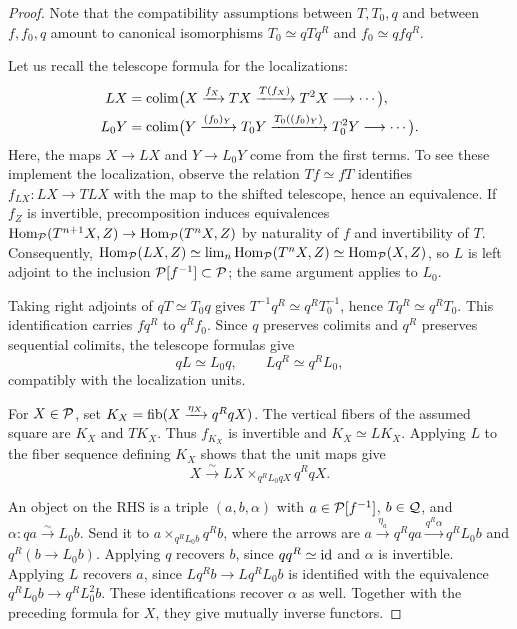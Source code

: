 \documentclass[12pt, letter]{amsart}
\theoremstyle{definition}
\begin{document}
\begin{proof}
Note that the compatibility assumptions between $T, T_0, q$ and between $f, f_0, q$ amount to canonical isomorphisms $T_0 \simeq q T q^R$ and $f_0 \simeq q f q^R$. 

Let us recall the telescope formula for the localizations:
\[
\begin{aligned}
 LX&=\operatorname*{colim}\bigl(X\xrightarrow{f_X}TX
       \xrightarrow{T(f_X)}T^2X\longrightarrow\cdots\bigr),\\
 L_0Y&=\operatorname*{colim}\bigl(Y\xrightarrow{(f_0)_Y}T_0Y
       \xrightarrow{T_0((f_0)_Y)}T_0^2Y\longrightarrow\cdots\bigr).
\end{aligned}
\]
Here, 
the maps $X\to LX$ and $Y\to L_0Y$ come from the first terms.
To see these implement the localization, observe the relation $Tf\simeq fT$ identifies $f_{LX}:LX\to TLX$ with the map to the shifted telescope, hence an equivalence.
If $f_Z$ is invertible, precomposition induces equivalences
$\operatorname{Hom}_{\mathcal{P}}(T^{n+1}X,Z)\to\operatorname{Hom}_{\mathcal{P}}(T^nX,Z)$ by naturality of $f$ and invertibility of $T$.
Consequently, $
 \operatorname{Hom}_{\mathcal{P}}(LX,Z)
 \simeq\lim_n\operatorname{Hom}_{\mathcal{P}}(T^nX,Z)
 \simeq\operatorname{Hom}_{\mathcal{P}}(X,Z)$, so  $L$ is left adjoint to the inclusion $\mathcal{P}[f^{-1}]\subset\mathcal{P}$; the same argument applies to $L_0$.

Taking right adjoints of $qT\simeq T_0q$ gives
$T^{-1}q^R\simeq q^RT_0^{-1}$, hence $Tq^R\simeq q^RT_0$.
This identification carries $fq^R$ to $q^Rf_0$.
Since $q$ preserves colimits and $q^R$ preserves sequential colimits, the telescope formulas give
\[
 qL\simeq L_0q,\qquad Lq^R\simeq q^RL_0,
\]
compatibly with the localization units.

For $X\in\mathcal{P}$, set $K_X=\operatorname{fib}(X\xrightarrow{\eta_X}q^RqX)$.
The vertical fibers of the assumed square are $K_X$ and $TK_X$.
Thus $f_{K_X}$ is invertible and $K_X\simeq LK_X$.
Applying $L$ to the fiber sequence defining $K_X$ shows that the unit maps give
\[
 X\xrightarrow{\sim}LX\times_{q^RL_0qX}q^RqX.
\]

An object on the RHS is a triple $(a,b,\alpha)$ with
$a\in\mathcal{P}[f^{-1}]$, $b\in\mathcal{Q}$, and $\alpha:qa\xrightarrow{\sim}L_0b$.
Send it to
 $a\times_{q^RL_0b}q^Rb$,
where the arrows are $a\xrightarrow{\eta_a}q^Rqa\xrightarrow{q^R\alpha}q^RL_0b$ and $q^R(b\to L_0b)$.
Applying $q$ recovers $b$, since $qq^R\simeq\mathrm{id}$ and $\alpha$ is invertible.
Applying $L$ recovers $a$, since $Lq^Rb\to Lq^RL_0b$ is identified with the equivalence $q^RL_0b\to q^RL_0^2b$.
These identifications recover $\alpha$ as well.
Together with the preceding formula for $X$, they give mutually inverse functors.
\end{proof}
\end{document}
